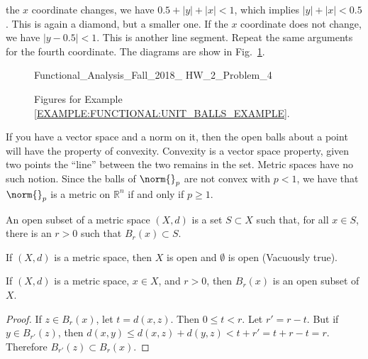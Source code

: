\documentclass[crop=false,class=book,oneside]{standalone}
\begin{document}
\begin{example}
            the $x$ coordinate changes, we have
            $0.5+|y|+|x|<1$, which implies
            $|y|+|x|<0.5$. This is again a diamond, but a
            smaller one. If the $x$ coordinate does not
            change, we have $|y-0.5|<1$. This is another
            line segment. Repeat the same arguments for the
            fourth coordinate. The diagrams are show in
            Fig.~\ref{FUNCTIONAL:HOMEWORK:2:PROBLEM:4:FIGURES}.
        \begin{figure}[H]
            \centering
            \captionsetup{type=figure}
            
                      {Functional_Analysis_Fall_2018_%
                       HW_2_Problem_4}
            \caption{Figures for Example
                     \ref{EXAMPLE:FUNCTIONAL:UNIT_BALLS_EXAMPLE}.}
            \label{FUNCTIONAL:HOMEWORK:2:PROBLEM:4:FIGURES}
        \end{figure}
            \end{example}
            If you have a vector space and a norm on it,
            then the open balls about a point will have the
            property of convexity. Convexity is a vector space
            property, given two points the ``line'' between the
            two remains in the set. Metric spaces have no such
            notion. Since the balls of $\norm{}_{p}$ are not
            convex with $p<1$, we have that $\norm{}_{p}$ is
            a metric on $\mathbb{R}^{n}$
            if and only if $p\geq{1}$.
            \begin{definition}
                An open subset of a metric space
                $(X,d)$ is a set $S\subset{X}$ such that,
                for all $x\in{S}$, there is an
                $r>0$ such that
                $B_{r}(x)\subset{S}$.
            \end{definition}
            \begin{example}
                If $(X,d)$ is a metric space, then
                $X$ is open and $\emptyset$ is open
                (Vacuously true).
            \end{example}
            \begin{theorem}
                If $(X,d)$ is a metric space, $x\in{X}$,
                and $r>0$, then $B_{r}(x)$ is an open
                subset of $X$.
            \end{theorem}
            \begin{proof}
                If $z\in{B_{r}(x)}$, let $t=d(x,z)$.
                Then $0\leq{t}<r$. Let $r'=r-t$.
                But if $y\in{B_{r'}(z)}$, then
                $d(x,y)\leq{d(x,z)+d(y,z)}<t+r'=t+r-t=r$.
                Therefore $B_{r'}(z)\subset{B_{r}(x)}$.
            \end{proof}
\end{document}
